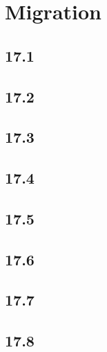 \part{Migration}

 \chapter{17.1}

 \chapter{17.2}

 \chapter{17.3}

 \chapter{17.4}

 \chapter{17.5}

 \chapter{17.6}

 \chapter{17.7}

 \chapter{17.8}









